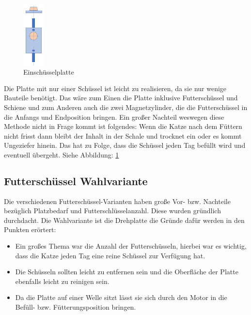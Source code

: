 \begin{figure}
\vspace{-20pt}
  \begin{center}
    \includegraphics[width=0.10\textwidth]{Bilder/Powerpoint/Einschuessel_platte}
  \end{center}
  \caption{Einschüsselplatte}
  \label{Schüssel Eins}
  \vspace{-10pt}
\end{figure}

Die Platte mit nur einer Schüssel ist leicht zu realisieren, da sie nur wenige Bauteile benötigt. Das wäre zum Einen die Platte inklusive Futterschüssel und Schiene und zum Anderen auch die zwei Magnetzylinder, die die Futterschüssel in die Anfangs und Endposition bringen. Ein großer Nachteil weswegen diese Methode nicht in Frage kommt ist folgendes: Wenn die Katze nach dem Füttern nicht frisst dann bleibt der Inhalt in der Schale und trocknet ein oder es kommt Ungeziefer hinein. Das hat zu Folge, dass die Schüssel jeden Tag befüllt wird und eventuell übergeht. Siehe Abbildung: \ref{Schüssel Eins} 

\subsection{Futterschüssel Wahlvariante}

Die verschiedenen Futterschüssel-Varianten haben große Vor- bzw. Nachteile bezüglich Platzbedarf und Futterschlüsselanzahl. Diese wurden gründlich durchdacht. Die Wahlvariante ist die Drehplatte die Gründe dafür werden in den Punkten erörtert: 

\begin{itemize}
\item Ein großes Thema war die Anzahl der Futterschüsseln, hierbei war es wichtig, dass die Katze jeden Tag eine reine Schüssel zur Verfügung hat.
\item Die Schüsseln sollten leicht zu entfernen sein und die Oberfläche der Platte ebenfalls leicht zu reinigen sein.
\item Da die Platte auf einer Welle sitzt lässt sie sich durch den Motor in die Befüll- bzw. Fütterungsposition bringen.
\end{itemize} 

